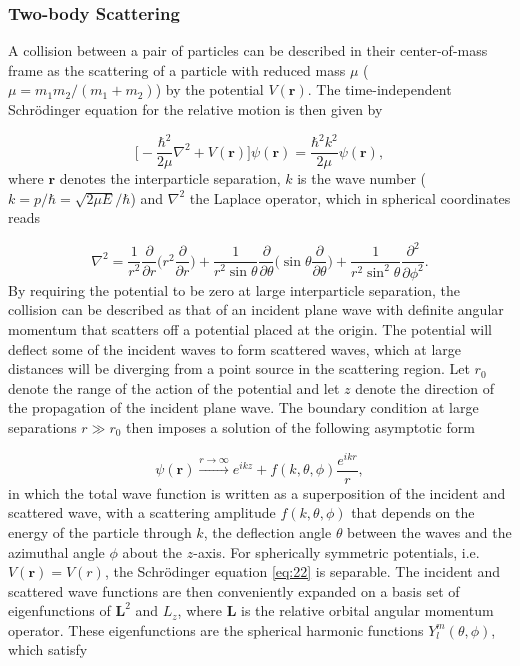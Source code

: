\documentclass{article}
\numberwithin{equation}{section}
\begin{document}
\subsubsection{Two-body Scattering} \label{Two-body scattering}
A collision between a pair of particles can be described in their center-of-mass frame as the scattering of a particle with reduced mass $\mu$ ($\mu = m_1m_2/(m_1 + m_2)$) by the potential $V(\mathbf{r})$. The time-independent  Schr{\"o}dinger equation for the relative motion is then given by 

\begin{equation} \label{eq:22}
\bigg[-\frac{\hbar^2}{2\mu}\nabla^2 + V(\mathbf{r})\bigg]\psi(\mathbf{r}) = \frac{\hbar^2 k^2}{2 \mu}\psi(\mathbf{r}),
\end{equation}
where $\mathbf{r}$ denotes the interparticle separation, $k$ is the wave number ($k=p/\hbar = \sqrt{2\mu E}/\hbar$) and $\nabla^2$ the Laplace operator, which in spherical coordinates reads

\begin{equation} \label{eq:23}
\nabla^2 = \frac{1}{r^2} \frac{\partial}{\partial r} \bigg(r^2 \frac{\partial}{\partial r}\bigg) + \frac{1}{r^2 \sin\theta} \frac{\partial}{\partial\theta} \bigg(\sin\theta \frac{\partial}{\partial\theta}\bigg) + \frac{1}{r^2 \sin^2\theta} \frac{\partial^2}{\partial\phi^2}.
\end{equation}
By requiring the potential to be zero at large interparticle separation, the collision can be described as that of an incident plane wave with definite angular momentum that scatters off a potential placed at the origin. The potential will deflect some of the incident waves to form scattered waves, which at large distances will be diverging from a point source in the scattering region. Let $r_0$ denote the range of the action of the potential and let $z$ denote the direction of the propagation of the incident plane wave. The boundary condition at large separations $r \gg r_0$ then imposes a solution of the following asymptotic form

\begin{equation}\label{eq:26}
\psi(\mathbf{r}) \xrightarrow{r \to \infty} e^{ikz} + f(k,\theta,\phi)\frac{e^{ikr}}{r},
\end{equation}
in which the total wave function is written as a superposition of the incident and scattered wave, with a scattering amplitude $f(k,\theta,\phi)$ that depends on the energy of the particle through $k$, the deflection angle $\theta$ between the waves and the azimuthal angle $\phi$ about the $z$-axis. For spherically symmetric potentials, i.e. $V(\mathbf{r}) = V(r)$, the Schr{\"o}dinger equation \eqref{eq:22} is separable. The incident and scattered wave functions are then conveniently expanded on a basis set of eigenfunctions of $\mathbf{L}^2$ and $L_z$, where $\mathbf{L}$ is the relative orbital angular momentum operator. These eigenfunctions are the spherical harmonic functions $Y_l^m(\theta,\phi)$, which satisfy 
\end{document}
